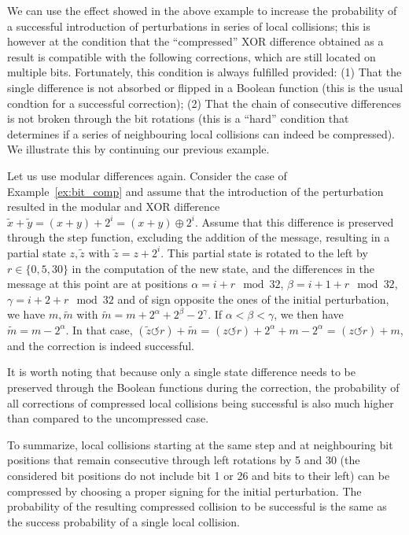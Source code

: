 We can use the effect showed in the above example to increase the probability of a successful introduction of perturbations in series of local collisions; this is however at the condition that
the ``compressed'' XOR difference obtained as a result is compatible with the following corrections, which are still located on multiple bits. Fortunately, this condition is always fulfilled
provided: (1) That the single difference is not absorbed or flipped in a Boolean function (this is the usual condtion for a successful correction); (2) That the chain of consecutive differences
is not broken through the bit rotations (this is a ``hard'' condition that determines if a series of neighbouring local collisions can indeed be compressed). We illustrate this by continuing
our previous example.

\begin{example}
\label{ex:bit_comp2}
Let us use modular differences again. Consider the case of Example~\ref{ex:bit_comp} and assume that the introduction of the perturbation resulted in the modular and XOR difference
$\widetilde{x} + \widetilde{y} = (x + y) + 2^{i}  = (x + y) \oplus 2^{i}$. Assume that this difference is preserved through the step function, excluding the addition of the message,
resulting in a partial state $z, \widetilde{z}$ with $\widetilde{z} = z + 2^{i}$. This partial state is rotated to the left by $r \in \{0, 5, 30\}$ in the computation of the new state,
and the differences in the message at this point are at positions $\alpha = i + r\mod32$, $\beta = i+1+r \mod 32$, $\gamma = i+2+r \mod 32$ and of sign opposite the ones of the initial perturbation,
\ie we have $m, \widetilde{m}$ with $\widetilde{m} = m + 2^{\alpha} + 2^{\beta} - 2^{\gamma}$. If $\alpha < \beta < \gamma$, we then have $\widetilde{m} = m - 2^{\alpha}$. In that case,
$(\widetilde{z} \circlearrowleft r) + \widetilde{m}$ = $(z \circlearrowleft r) + 2^{\alpha} + m - 2^{\alpha}$ = $(z \circlearrowleft r) + m$, and the correction is indeed successful.
\end{example}

It is worth noting that because only a single state difference needs to be preserved through the Boolean functions during the correction, the probability of all corrections of compressed
local collisions being successful is also much higher than compared to the uncompressed case.

To summarize, local collisions starting at the same step and at neighbouring bit positions that remain consecutive through left rotations by 5 and 30 (\ie the considered bit positions
do not include bit 1 or 26 and bits to their left) can be compressed by choosing a proper signing for the initial perturbation. The probability of the resulting compressed collision
to be successful is the same as the success probability of a single local collision.

